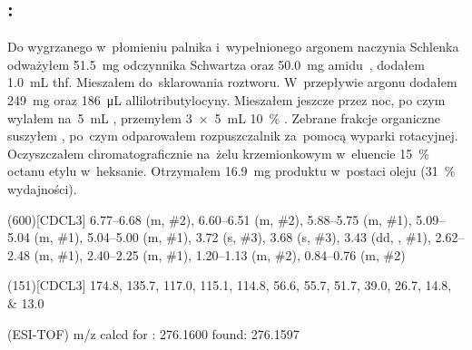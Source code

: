 \begin{fullwidth}
\subsection{%
  :
}\label{syn:b-aminoester-cycloprop.allyl}
\end{fullwidth}
\marginnote{}
Do wygrzanego w~płomieniu palnika i~wypełnionego argonem naczynia Schlenka odważyłem
  \SI{51.5}{\mg} odczynnika Schwartza oraz \SI{50.0}{\mg} amidu~,
  dodałem \SI{1.0}{\mL} \gls{thf}.
Mieszałem do~sklarowania roztworu.
W~przepływie argonu dodałem  \SI{249}{\mg}  oraz  \SI{186}{\uL} allilotributylocyny.
Mieszałem jeszcze przez noc, po czym wylałem na~\SI{5}{\mL} ,
  przemyłem \SI[product-units = single]{3 x 5}{\mL} \SI{10}{\percent} .
Zebrane frakcje organiczne suszyłem , po~czym odparowałem rozpuszczalnik za~pomocą
  wyparki rotacyjnej.
Oczyszczałem chromatograficznie na~żelu krzemionkowym w~eluencie \SI{15}{\percent} octanu
  etylu w~heksanie.
Otrzymałem \SI{16.9}{\mg} produktu w~postaci oleju (\SI{31}{\percent} wydajności).

\begin{fullexp}
  \NMR(600)[CDCL3] \numrange{6.77}{6.68} (m, \#{2}), \numrange{6.60}{6.51} (m, \#{2}), \numrange{5.88}{5.75} (m, \#{1}), \numrange{5.09}{5.04} (m, \#{1}), \numrange{5.04}{5.00} (m, \#{1}), \num{3.72} (s, \#{3}), \num{3.68} (s, \#{3}), \num{3.43} (dd, , \#{1}), \numrange{2.62}{2.48} (m, \#{1}), \numrange{2.40}{2.25} (m, \#{1}), \numrange{1.20}{1.13} (m, \#{2}), \numrange{0.84}{0.76} (m, \#{2})\par\noindent
  (151)[CDCL3] \numlist{174.8; 135.7; 117.0; 115.1; 114.8; 56.6; 55.7; 51.7; 39.0; 26.7; 14.8; 13.0}\par\noindent
   (ESI-TOF) m/z calcd for : \num{276.1600} found: \num{276.1597}
\end{fullexp}

